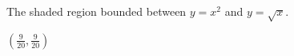 {The shaded region bounded between $y=x^2$ and $y=\sqrt x$.\\

\noindent\begin{minipage}{\linewidth}
\centering
{}
\end{minipage}
}
{$\left(\frac{9}{20}, \frac{9}{20}  \right)$
}
